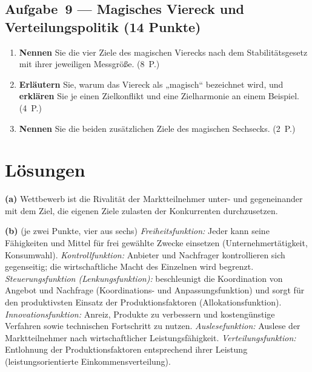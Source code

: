 \documentclass[11pt, a4paper]{article}
\begin{document}
\subsection*{Aufgabe~9 --- Magisches Viereck und Verteilungspolitik (14 Punkte)}

\begin{enumerate}[label=(\alph*)]
  \item \textbf{Nennen} Sie die vier Ziele des magischen Vierecks nach dem Stabilitätsgesetz mit ihrer jeweiligen Messgröße. \hfill (8~P.)
  \item \textbf{Erläutern} Sie, warum das Viereck als „magisch`` bezeichnet wird, und \textbf{erklären} Sie je einen Zielkonflikt und eine Zielharmonie an einem Beispiel. \hfill (4~P.)
  \item \textbf{Nennen} Sie die beiden zusätzlichen Ziele des magischen Sechsecks. \hfill (2~P.)
\end{enumerate}

\newpage
\section{Lösungen}\label{loesungen}

\begin{loesung}[title={Lösung Aufgabe~1 --- Funktionen des Wettbewerbs}]
\textbf{(a)} Wettbewerb ist die Rivalität der Marktteilnehmer unter- und gegeneinander
mit dem Ziel, die eigenen Ziele zulasten der Konkurrenten durchzusetzen.

\textbf{(b)} (je zwei Punkte, vier aus sechs) \emph{Freiheitsfunktion:} Jeder kann seine
Fähigkeiten und Mittel für frei gewählte Zwecke einsetzen (Unternehmertätigkeit,
Konsumwahl). \emph{Kontrollfunktion:} Anbieter und Nachfrager kontrollieren sich
gegenseitig; die wirtschaftliche Macht des Einzelnen wird begrenzt.
\emph{Steuerungsfunktion (Lenkungsfunktion):} beschleunigt die Koordination von Angebot
und Nachfrage (Koordinations- und Anpassungsfunktion) und sorgt für den produktivsten
Einsatz der Produktionsfaktoren (Allokationsfunktion). \emph{Innovationsfunktion:}
Anreiz, Produkte zu verbessern und kostengünstige Verfahren sowie technischen Fortschritt
zu nutzen. \emph{Auslesefunktion:} Auslese der Marktteilnehmer nach wirtschaftlicher
Leistungsfähigkeit. \emph{Verteilungsfunktion:} Entlohnung der Produktionsfaktoren
entsprechend ihrer Leistung (leistungsorientierte Einkommensverteilung).
\end{loesung}
\end{document}
